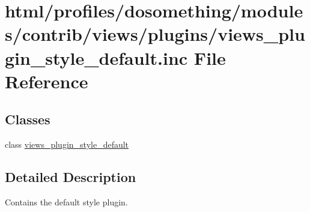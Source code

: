 \hypertarget{views__plugin__style__default_8inc}{
\section{html/profiles/dosomething/modules/contrib/views/plugins/views\_\-plugin\_\-style\_\-default.inc File Reference}
\label{views__plugin__style__default_8inc}
}
\subsection*{Classes}
\begin{DoxyCompactItemize}
\item 
class \hyperlink{classviews__plugin__style__default}{views\_\-plugin\_\-style\_\-default}
\end{DoxyCompactItemize}


\subsection{Detailed Description}
Contains the default style plugin. 
